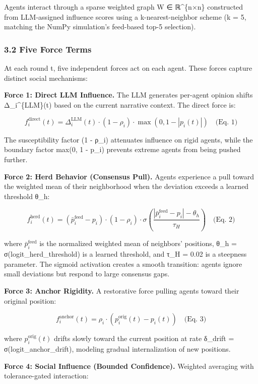 \documentclass[
]{article}
\begin{document}
Agents interact through a sparse weighted graph W ∈ ℝ\^{}\{n×n\}
constructed from LLM-assigned influence scores using a
k-nearest-neighbor scheme (k = 5, matching the NumPy simulation's
feed-based top-5 selection).

\subsubsection{3.2 Five Force Terms}\label{five-force-terms}

At each round t, five independent forces act on each agent. These forces
capture distinct social mechanisms:

\textbf{Force 1: Direct LLM Influence.} The LLM generates per-agent
opinion shifts Δ\_i\^{}\{LLM\}(t) based on the current narrative
context. The direct force is:

\[f_i^{\text{direct}}(t) = \Delta_i^{\text{LLM}}(t) \cdot (1 - \rho_i) \cdot \max(0, 1 - |p_i(t)|) \quad \text{(Eq. 1)}\]

The susceptibility factor (1 - ρ\_i) attenuates influence on rigid
agents, while the boundary factor max(0, 1 - \textbar p\_i\textbar)
prevents extreme agents from being pushed further.

\textbf{Force 2: Herd Behavior (Consensus Pull).} Agents experience a
pull toward the weighted mean of their neighborhood when the deviation
exceeds a learned threshold θ\_h:

\[f_i^{\text{herd}}(t) = (\bar{p}_i^{\text{feed}} - p_i) \cdot (1 - \rho_i) \cdot \sigma\left(\frac{|\bar{p}_i^{\text{feed}} - p_i| - \theta_h}{\tau_H}\right) \quad \text{(Eq. 2)}\]

where \(\bar{p}_i^{\text{feed}}\) is the normalized weighted mean of
neighbors' positions, θ\_h = σ(logit\_herd\_threshold) is a learned
threshold, and τ\_H = 0.02 is a steepness parameter. The sigmoid
activation creates a smooth transition: agents ignore small deviations
but respond to large consensus gaps.

\textbf{Force 3: Anchor Rigidity.} A restorative force pulling agents
toward their original position:

\[f_i^{\text{anchor}}(t) = \rho_i \cdot (p_i^{\text{orig}}(t) - p_i(t)) \quad \text{(Eq. 3)}\]

where \(p_i^{\text{orig}}(t)\) drifts slowly toward the current position
at rate δ\_drift = σ(logit\_anchor\_drift), modeling gradual
internalization of new positions.

\textbf{Force 4: Social Influence (Bounded Confidence).} Weighted
averaging with tolerance-gated interaction:
\end{document}
